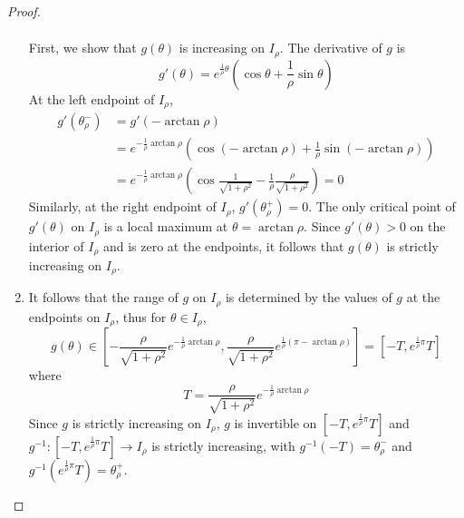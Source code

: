 \documentclass[thesis.tex]{subfiles}
\begin{document}
\begin{lemma}
\begin{proof}
\begin{enumerate}
\begin{align}
	\end{align}
	First, we show that $g(\theta)$ is increasing on $I_\rho$. The derivative of $g$ is 
	\begin{equation}\label{gprime}
	g'(\theta) = e^{ \frac{1}{\rho} \theta } \left( \cos \theta + \frac{1}{\rho} \sin \theta \right)
	\end{equation}
	At the left endpoint of $I_\rho$,
	\begin{align*}
	g'(\theta_\rho^-) &= g'(-\arctan \rho) \\
	 &= e^{ -\frac{1}{\rho} \arctan \rho } \left(\cos(-\arctan \rho) + \frac{1}{\rho} \sin(-\arctan \rho)\right) \\
	&= e^{ -\frac{1}{\rho} \arctan \rho } \left(\cos\frac{1}{\sqrt{1 + \rho^2}} - \frac{1}{\rho} \frac{\rho}{\sqrt{1 + \rho^2}}\right) = 0
	\end{align*}
	Similarly, at the right endpoint of $I_\rho$, $g'(\theta_\rho^+) = 0$.
	The only critical point of $g'(\theta)$ on $I_\rho$ is a local maximum at $\theta = \arctan \rho$. Since $g'(\theta) > 0$ on the interior of $I_\rho$ and is zero at the endpoints, it follows that $g(\theta)$ is strictly increasing on $I_\rho$.
	
	\item It follows that the range of $g$ on $I_\rho$ is determined by the values of $g$ at the endpoints on $I_\rho$, thus for $\theta \in I_\rho$,
	\begin{equation}\label{grange}
	g(\theta) \in \left[ -\frac{\rho}{\sqrt{1+\rho^2}}e^{-\frac{1}{\rho}\arctan \rho}, \frac{\rho}{\sqrt{1+\rho^2}}e^{\frac{1}{\rho}(\pi - \arctan \rho)}\right] = [-T, e^{\frac{1}{\rho}\pi} T]
	\end{equation}
	where 
	\begin{equation}\label{defT}
	T = \frac{\rho}{\sqrt{1+\rho^2}}e^{-\frac{1}{\rho}\arctan \rho}
	\end{equation}
	Since $g$ is strictly increasing on $I_\rho$, $g$ is invertible on $[-T, e^{\frac{1}{\rho}\pi} T]$ and $g^{-1}: [-T, e^{\frac{1}{\rho}\pi} T] \rightarrow I_\rho$ is strictly increasing, with $g^{-1}(-T) = \theta_\rho^-$ and $g^{-1}(e^{\frac{1}{\rho}\pi} T) = \theta_\rho^+$.


\end{enumerate}
\end{proof}
\end{lemma}
\end{document}
